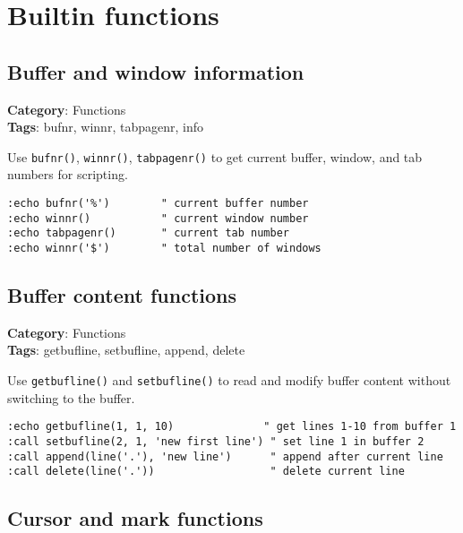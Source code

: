 \chapter{Builtin functions}
\section{Buffer and window information}

\textbf{Category}: Functions\\ \textbf{Tags}: bufnr, winnr, tabpagenr, info
\vspace{0.5cm}

Use {\footnotesize \Verb§bufnr()§}, {\footnotesize \Verb§winnr()§}, {\footnotesize \Verb§tabpagenr()§} to get current buffer, window, and tab numbers for scripting.

\begin{Exa*}{}
\begin{Verbatim}[fontsize=\footnotesize, breaklines, breakanywhere]
:echo bufnr('%')        " current buffer number
:echo winnr()           " current window number
:echo tabpagenr()       " current tab number
:echo winnr('$')        " total number of windows
\end{Verbatim}
\end{Exa*}

\section{Buffer content functions}

\textbf{Category}: Functions\\ \textbf{Tags}: getbufline, setbufline, append, delete
\vspace{0.5cm}

Use {\footnotesize \Verb§getbufline()§} and {\footnotesize \Verb§setbufline()§} to read and modify buffer content without switching to the buffer.

\begin{Exa*}{}
\begin{Verbatim}[fontsize=\footnotesize, breaklines, breakanywhere]
:echo getbufline(1, 1, 10)              " get lines 1-10 from buffer 1
:call setbufline(2, 1, 'new first line') " set line 1 in buffer 2
:call append(line('.'), 'new line')      " append after current line
:call delete(line('.'))                  " delete current line
\end{Verbatim}
\end{Exa*}

\section{Cursor and mark functions}

